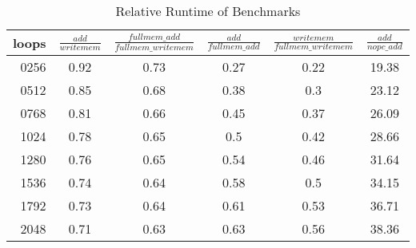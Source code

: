 \begin{table}
    \centering
    \begin{tabular}{r|cc|cc|c}
        loops & $\frac{add}{writemem}$ & $\frac{fullmem\_add}{fullmem\_writemem}$ & $\frac{add}{fullmem\_add}$ & $\frac{writemem}{fullmem\_writemem}$ & $\frac{add}{nopc\_add}$ \\
        \hline
        0256  & 0.92                   & 0.73                                     & 0.27                       & 0.22                                 & 19.38                   \\
        0512  & 0.85                   & 0.68                                     & 0.38                       & 0.3                                  & 23.12                   \\
        0768  & 0.81                   & 0.66                                     & 0.45                       & 0.37                                 & 26.09                   \\
        1024  & 0.78                   & 0.65                                     & 0.5                        & 0.42                                 & 28.66                   \\
        1280  & 0.76                   & 0.65                                     & 0.54                       & 0.46                                 & 31.64                   \\
        1536  & 0.74                   & 0.64                                     & 0.58                       & 0.5                                  & 34.15                   \\
        1792  & 0.73                   & 0.64                                     & 0.61                       & 0.53                                 & 36.71                   \\
        2048  & 0.71                   & 0.63                                     & 0.63                       & 0.56                                 & 38.36                   \\
    \end{tabular}
    \caption{Relative Runtime of Benchmarks}\label{tab:time_rel}
\end{table}
